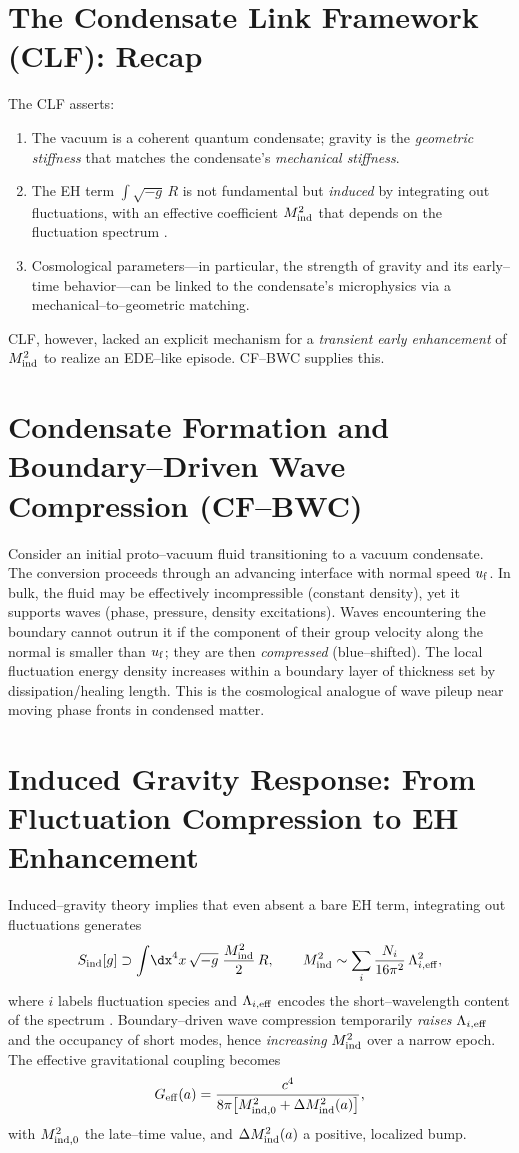 \documentclass[11pt,a4paper]{article}
\newcommand{\Geff}{G_{\rm eff}}
\newcommand{\be}{\begin{equation}}
\newcommand{\ee}{\end{equation}}
\begin{document}
\section{The Condensate Link Framework (CLF): Recap}
The CLF asserts:
\begin{enumerate}
\item The vacuum is a coherent quantum condensate; gravity is the \emph{geometric stiffness} that matches the condensate's \emph{mechanical stiffness}.
\item The EH term $\int \sqrt{-g}\,R$ is not fundamental but \emph{induced} by integrating out fluctuations, with an effective coefficient $M_{\rm ind}^2$ that depends on the fluctuation spectrum \cite{Sakharov1967,Vassilevich2003}.
\item Cosmological parameters---in particular, the strength of gravity and its early--time behavior---can be linked to the condensate's microphysics via a mechanical--to--geometric matching.
\end{enumerate}
CLF, however, lacked an explicit mechanism for a \emph{transient early enhancement} of $M_{\rm ind}^2$ to realize an EDE--like episode. CF--BWC supplies this.

\section{Condensate Formation and Boundary--Driven Wave Compression (CF--BWC)}
Consider an initial proto--vacuum fluid transitioning to a vacuum condensate. The conversion proceeds through an advancing interface with normal speed $u_{\rm f}$. In bulk, the fluid may be effectively incompressible (constant density), yet it supports waves (phase, pressure, density excitations). Waves encountering the boundary cannot outrun it if the component of their group velocity along the normal is smaller than $u_{\rm f}$; they are then \emph{compressed} (blue--shifted). The local fluctuation energy density increases within a boundary layer of thickness set by dissipation/healing length. This is the cosmological analogue of wave pileup near moving phase fronts in condensed matter.

\section{Induced Gravity Response: From Fluctuation Compression to EH Enhancement}
Induced--gravity theory implies that even absent a bare EH term, integrating out fluctuations generates
\be
S_{\rm ind}[g] \supset \int\! \dx^4 x\, \sqrt{-g}\;\frac{M_{\rm ind}^2}{2}\,R, 
\qquad M_{\rm ind}^2 \sim \sum_i \frac{N_i}{16\pi^2}\,\Lambda_{i,{\rm eff}}^2,
\ee
where $i$ labels fluctuation species and $\Lambda_{i,{\rm eff}}$ encodes the short--wavelength content of the spectrum \cite{Sakharov1967,Vassilevich2003}. Boundary--driven wave compression temporarily \emph{raises} $\Lambda_{i,{\rm eff}}$ and the occupancy of short modes, hence \emph{increasing} $M_{\rm ind}^2$ over a narrow epoch. The effective gravitational coupling becomes
\be
\Geff(a)=\frac{c^4}{8\pi\big[M_{\rm ind,0}^2+\Delta M_{\rm ind}^2(a)\big]},
\ee
with $M_{\rm ind,0}^2$ the late--time value, and $\Delta M_{\rm ind}^2(a)$ a positive, localized bump.
\end{document}
